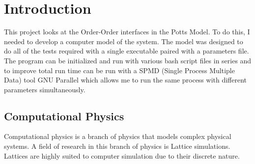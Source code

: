 \chapter{Introduction}
This project looks at the Order-Order interfaces in the Potts Model.
To do this, I needed to develop a computer model of the system.
The model was designed to do all of the tests required with a single executable paired with a parameters file.
The program can be initialized and run with various bash script files in series and to improve total run time can be run with a SPMD (Single Process Multiple Data) tool GNU Parallel\cite{Tange2011a} which allows me to run the same process with different parameters simultaneously.

\section{Computational Physics}
Computational physics is a branch of physics that models complex physical systems.
A field of research in this branch of physics is Lattice simulations.
Lattices are highly suited to computer simulation due to their discrete nature.
